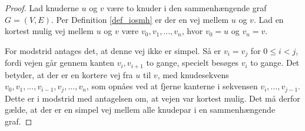 \begin{proof}
Lad knuderne $u$ og $v$ være to knuder i den sammenhængende graf $G=(V,E)$.
Per Definition \ref{def_iosmh} er der en vej mellem $u$ og $v$.
Lad en kortest mulig vej mellem $u$ og $v$ være $v_0,v_1,...,v_n$, hvor $v_0=u$ og $v_n=v$.

For modstrid antages det, at denne vej ikke er simpel. 
Så er $v_i=v_j$ for $0 \leq i < j$, fordi vejen går gennem kanten $v_i,v_{i+1}$ to gange, specielt besøges $v_i$ to gange.
Det betyder, at der er en kortere vej fra $u$ til $v$, med knudesekvens $v_0,v_1,...,v_{i-1},v_j,...,v_n$, som opnåes ved at fjerne kanterne i sekvensen $v_i,...,v_{j-1}$.
Dette er i modstrid med antagelsen om, at vejen var kortest mulig.
Det må derfor gælde, at der er en simpel vej mellem alle knudepar i en sammenhængende graf. 
\end{proof}



